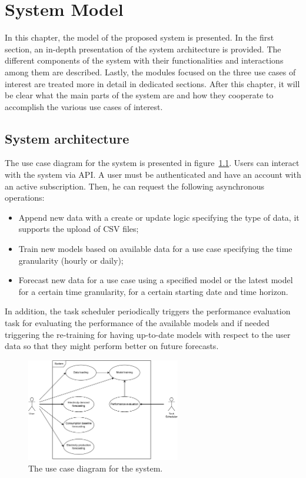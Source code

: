 \chapter{System Model}
\label{cha:system}
\vspace{0.4 cm}

In this chapter, the model of the proposed system is presented.
In the first section, an in-depth presentation of the system architecture is provided.
The different components of the system with their functionalities and interactions among them are described.
Lastly, the modules focused on the three use cases of interest are treated more in detail in dedicated sections.
After this chapter, it will be clear what the main parts of the system are and how they cooperate to accomplish the various use cases of interest.


\section{System architecture}
\label{sec:architecture}
\vspace{0.2 cm}


The use case diagram for the system is presented in figure~\ref{fig:usecase}.
Users can interact with the system via API.
A user must be authenticated and have an account with an active subscription.
Then, he can request the following asynchronous operations:
\begin{itemize}
  \item Append new data with a create or update logic specifying the type of data, it supports the upload of CSV files;
  \item Train new models based on available data for a use case specifying the time granularity (hourly or daily);
  \item Forecast new data for a use case using a specified model or the latest model for a certain time granularity, for a certain starting date and time horizon.
\end{itemize}

In addition, the task scheduler periodically triggers the performance evaluation task for evaluating the performance of the available models and if needed triggering the re-training for having up-to-date models with respect to the user data so that they might perform better on future forecasts.

\begin{figure}[H]
\centering
\includegraphics[width=0.6\textwidth]{images/architecture_use_case}
\caption{The use case diagram for the system.}
\label{fig:usecase}
\end{figure}

